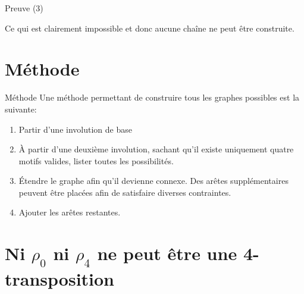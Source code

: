 \documentclass[10pt]{beamer}
\begin{document}
\begin{frame}{Preuve (3)}
\begin{figure}[H]
\begin{center}
    \end{center}
  \end{figure}

  Ce qui est clairement impossible et donc aucune chaîne ne peut être construite.

\end{frame}

\section{Méthode}

\begin{frame}{Méthode}
  Une méthode permettant de construire tous les graphes possibles est la suivante:

  \begin{enumerate}
    \item Partir d'une involution de base
    \item À partir d'une deuxième involution, sachant qu'il existe uniquement quatre motifs valides, lister toutes les possibilités.
    \item Étendre le graphe afin qu'il devienne connexe. Des arêtes supplémentaires peuvent être placées afin de satisfaire diverses contraintes.
    \item Ajouter les arêtes restantes.
  \end{enumerate}
\end{frame}

\section{Ni $\rho_0$ ni $\rho_4$ ne peut être une 4-transposition}
\end{document}
